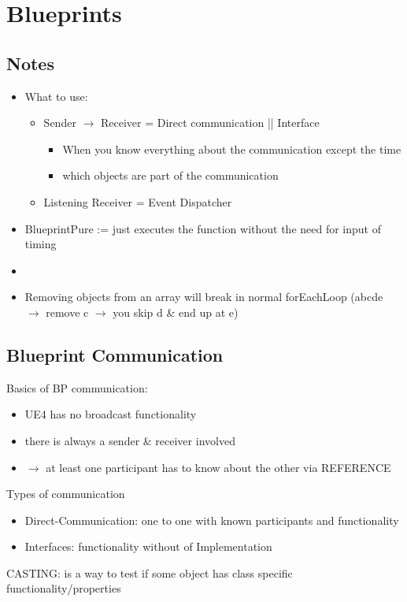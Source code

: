 \chapter{Blueprints}
    \section{Notes}
        \begin{itemize}
            \item What to use:
            \begin{itemize}
                \item Sender $\rightarrow$ Receiver = Direct communication || Interface
                \begin{itemize}
                    \item When you know everything about the communication except the time
                    \item which objects are part of the communication
                \end{itemize}
                \item Listening Receiver = Event Dispatcher
            \end{itemize}
            \item BlueprintPure := just executes the function without the need for input of timing
            \item 
            \item Removing objects from an array will break in normal forEachLoop (abcde $\rightarrow$ remove c $\rightarrow$ you skip d \& end up at e)
        \end{itemize}


    \section{Blueprint Communication}
        Basics of BP communication:
        \begin{itemize}
            \item UE4 has no broadcast functionality
            \item there is always a sender \& receiver involved
            \item $\rightarrow$ at least one participant has to know about the other via REFERENCE
        \end{itemize}
        Types of communication
        \begin{itemize}
            \item Direct-Communication: one to one with known participants and functionality
            \item Interfaces: functionality without of Implementation 
        \end{itemize}
\smallskip
        CASTING: is a way to test if some object has class specific functionality/properties \\
\smallskip

